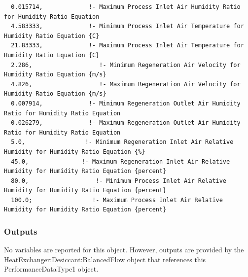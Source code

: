 \begin{lstlisting}
  0.015714,             !- Maximum Process Inlet Air Humidity Ratio for Humidity Ratio Equation
  4.583333,             !- Minimum Process Inlet Air Temperature for Humidity Ratio Equation {C}
  21.83333,             !- Maximum Process Inlet Air Temperature for Humidity Ratio Equation {C}
  2.286,                   !- Minimum Regeneration Air Velocity for Humidity Ratio Equation {m/s}
  4.826,                   !- Maximum Regeneration Air Velocity for Humidity Ratio Equation {m/s}
  0.007914,             !- Minimum Regeneration Outlet Air Humidity Ratio for Humidity Ratio Equation
  0.026279,             !- Maximum Regeneration Outlet Air Humidity Ratio for Humidity Ratio Equation
  5.0,                 !- Minimum Regeneration Inlet Air Relative Humidity for Humidity Ratio Equation {%}
  45.0,               !- Maximum Regeneration Inlet Air Relative Humidity for Humidity Ratio Equation {percent}
  80.0,                   !- Minimum Process Inlet Air Relative Humidity for Humidity Ratio Equation {percent}
  100.0;                 !- Maximum Process Inlet Air Relative Humidity for Humidity Ratio Equation {percent}
\end{lstlisting}

\subsubsection{Outputs}\label{outputs-3-008}

No variables are reported for this object. However, outputs are provided by the HeatExchanger:Desiccant:BalancedFlow object that references this PerformanceDataType1 object.
